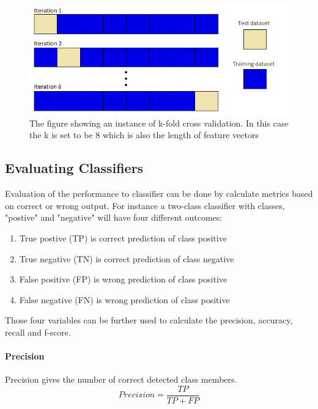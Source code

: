 \documentclass[USenglish]{ifimaster}  %
\begin{document}
	\begin{figure}[h]
		\centering
		\includegraphics[scale=0.6]{Figures/Kfold}
		\caption{The figure showing an instance of k-fold cross validation. In this case the k is set to be 8 which is also the length of feature vectors}
		\label{fig:kfold}
	\end{figure}
	
	
	
\subsection{Evaluating Classifiers}\label{subsec:evalclf}
Evaluation of the performance to classifier can be done by calculate metrics based on correct or wrong output. For instance a two-class classifier with classes, "postive" and "negative" will have four different outcomes:
	
	\begin{enumerate}
		\item True postive (TP) is correct prediction of class positive
		\item True negative (TN) is correct prediction of class negative
		\item False positive (FP) is wrong prediction of class positive
		\item False negative (FN) is wrong prediction of class positive
	\end{enumerate}
	
	Those four variables can be further used to calculate the precision, accuracy, recall and f-score.
	
	\paragraph{Precision}
	Precision gives the number of correct detected class members.
	\begin{equation}
	Precision = \frac{TP}{TP + FP}
	\label{eq:prec}
	\end{equation}
	
\end{document}
